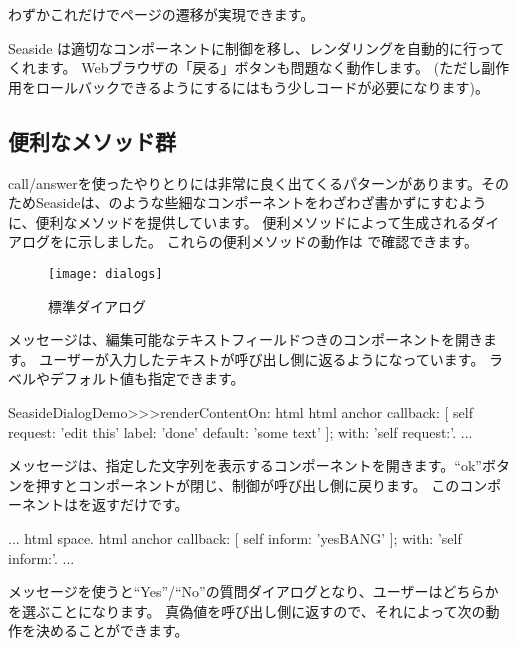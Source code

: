 \documentclass[a4paper,10pt,twoside]{book}
\begin{document}
わずかこれだけでページの遷移が実現できます。

Seaside は適切なコンポーネントに制御を移し、レンダリングを自動的に行ってくれます。
Webブラウザの「戻る」ボタンも問題なく動作します。 (ただし副作用をロールバックできるようにするにはもう少しコードが必要になります)。

\subsection{便利なメソッド群}

call/answerを使ったやりとりには非常に良く出てくるパターンがあります。そのためSeasideは、のような些細なコンポーネントをわざわざ書かずにすむように、便利なメソッドを提供しています。
便利メソッドによって生成されるダイアログをに示しました。
これらの便利メソッドの動作は で確認できます。

\begin{figure}[b]
\begin{center}
\texttt{[image: dialogs]}
\caption{標準ダイアログ}
\end{center}
\end{figure}

メッセージは、編集可能なテキストフィールドつきのコンポーネントを開きます。
ユーザーが入力したテキストが呼び出し側に返るようになっています。
ラベルやデフォルト値も指定できます。

\begin{code}{}
SeasideDialogDemo>>>renderContentOn: html
	html anchor
		callback: [ self request: 'edit this' label: 'done' default: 'some text' ];
		with: 'self request:'.
...
\end{code}

メッセージは、指定した文字列を表示するコンポーネントを開きます。``ok''ボタンを押すとコンポーネントが閉じ、制御が呼び出し側に戻ります。
このコンポーネントはを返すだけです。

\begin{code}{}
...
	html space.
	html anchor
		callback: [ self inform: 'yesBANG' ];
		with: 'self inform:'.
...
\end{code}

メッセージを使うと``Yes''/``No''の質問ダイアログとなり、ユーザーはどちらかを選ぶことになります。
真偽値を呼び出し側に返すので、それによって次の動作を決めることができます。
\end{document}
